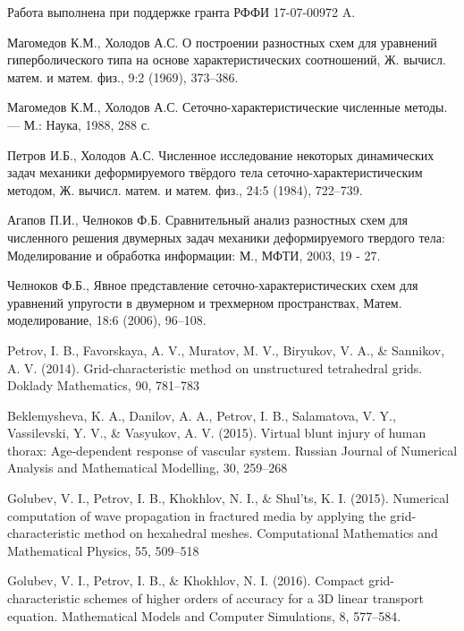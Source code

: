 \documentclass[a4paper]{article}
\numberwithin{equation}{section}
\begin{document}
Работа выполнена при поддержке гранта РФФИ 17-07-00972 A.


\begin{thebibliography}{99}
 Магомедов К.М., Холодов А.С. 
О построении разностных схем для уравнений гиперболического типа 
на основе характеристических соотношений, 
Ж. вычисл. матем. и матем. физ., 9:2 (1969), 373–386.

 Магомедов К.М., Холодов А.С. 
Сеточно-характеристические численные методы. — М.: Наука, 1988, 288 с.

 Петров И.Б., Холодов А.С. 
Численное исследование некоторых динамических задач механики деформируемого 
твёрдого тела сеточно-характеристическим методом, 
Ж. вычисл. матем. и матем. физ., 24:5 (1984), 722–739.

 Агапов П.И., Челноков Ф.Б. 
Сравнительный анализ разностных схем для численного решения 
двумерных задач механики деформируемого твердого тела: 
Моделирование и обработка информации: М., МФТИ, 2003, 19 - 27.

 Челноков Ф.Б., Явное представление 
сеточно-характеристических схем для уравнений упругости в двумерном и
 трехмерном пространствах, Матем. моделирование, 18:6 (2006), 96–108.

Petrov, I. B., Favorskaya, A. V., Muratov, M. V., Biryukov, V. A., \& Sannikov, A. V. (2014). 
Grid-characteristic method on unstructured tetrahedral grids. Doklady Mathematics, 90, 781–783

 Beklemysheva, K. A., Danilov, A. A., Petrov, I. B., 
Salamatova, V. Y., Vassilevski, Y. V., \& Vasyukov, A. V. (2015). 
Virtual blunt injury of human thorax: Age-dependent response of vascular system. 
Russian Journal of Numerical Analysis and Mathematical Modelling, 30, 259–268

 Golubev, V. I., Petrov, I. B., Khokhlov, N. I., \& Shul’ts, K. I. (2015). 
Numerical computation of wave propagation in fractured media 
by applying the grid-characteristic method on hexahedral meshes. 
Computational Mathematics and Mathematical Physics, 55, 509–518

 Golubev, V. I., Petrov, I. B., \& Khokhlov, N. I. (2016). 
Compact grid-characteristic schemes of higher orders of accuracy for a 3D linear transport equation. 
Mathematical Models and Computer Simulations, 8, 577–584. 


\end{thebibliography}
\end{document}
